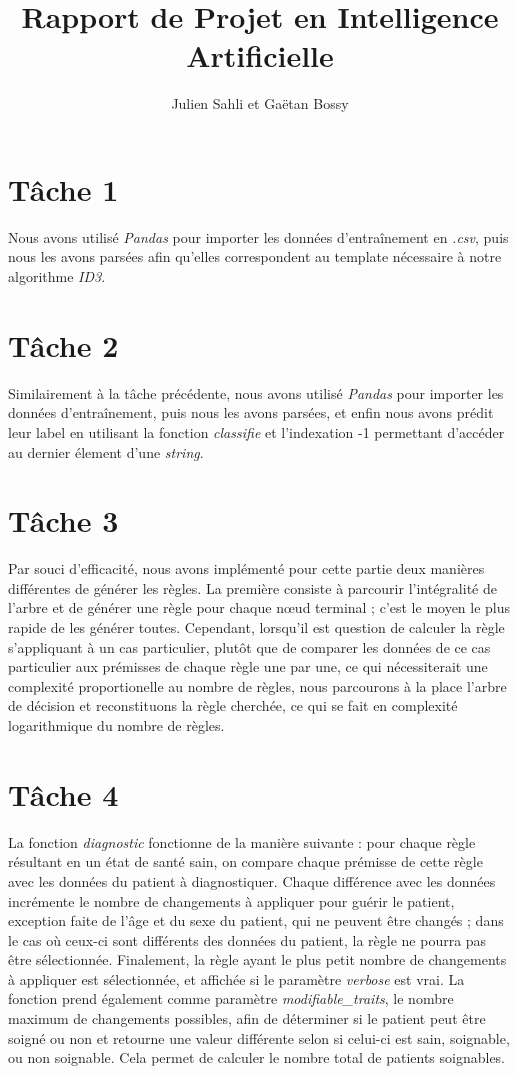 \documentclass[a4paper,11pt,french]{article}
\title{Rapport de Projet en Intelligence Artificielle}
\author{Julien Sahli et Gaëtan Bossy}
\begin{document}
\maketitle
\section{Tâche 1}
Nous avons utilisé \emph{Pandas} pour importer les données d'entraînement en \emph{.csv}, puis nous les avons parsées afin qu'elles correspondent au template nécessaire à notre algorithme \emph{ID3}. %
\section{Tâche 2}
Similairement à la tâche précédente, nous avons utilisé \emph{Pandas} pour importer les données d'entraînement, puis nous les avons parsées, et enfin nous avons prédit leur label en utilisant la fonction \emph{classifie} et l'indexation -1 permettant d'accéder au dernier élement d'une \emph{string}.
\section{Tâche 3}
Par souci d'efficacité, nous avons implémenté pour cette partie  deux manières différentes de générer les règles. La première consiste à parcourir l'intégralité de l'arbre et de générer une règle pour chaque nœud terminal ; c'est le moyen le plus rapide de les générer toutes. Cependant, lorsqu'il est question de calculer la règle s'appliquant à un cas particulier, plutôt que de comparer les données de ce cas particulier aux prémisses de chaque règle une par une, ce qui nécessiterait une complexité proportionelle au nombre de règles, nous parcourons à la place l'arbre de décision et reconstituons la règle cherchée, ce qui se fait en complexité logarithmique du nombre de règles.
\section{Tâche 4}
La fonction \emph{diagnostic} fonctionne de la manière suivante : pour chaque règle résultant en un état de santé sain, on compare chaque prémisse de cette règle avec les données du patient à diagnostiquer. Chaque différence avec les données incrémente le nombre de changements à appliquer pour guérir le patient, exception faite de l'âge et du sexe du patient, qui ne peuvent être changés ; dans le cas où ceux-ci sont différents des données du patient, la règle ne pourra pas être sélectionnée. Finalement, la règle ayant le plus petit nombre de changements à appliquer est sélectionnée, et affichée si le paramètre \emph{verbose} est vrai. La fonction prend également comme paramètre \emph{modifiable\_traits}, le nombre maximum de changements possibles, afin de déterminer si le patient peut être soigné ou non et retourne une valeur différente selon si celui-ci est sain, soignable, ou non soignable. Cela permet de calculer le nombre total de patients soignables.
\end{document}
